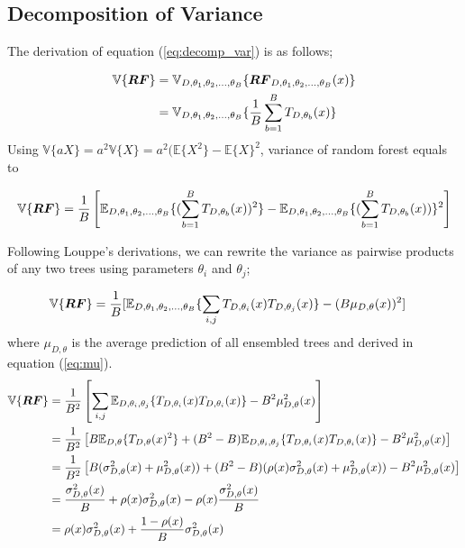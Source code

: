 \subsection{Decomposition of Variance}
\label{app:var_decomp}
The derivation of equation (\ref{eq:decomp_var}) is as follows;

\begin{align}
\mathbb{V}\{\boldsymbol{RF}\} & = \mathbb{V}_{D, \theta_{1}, \theta_{2},..., \theta_{B}}\{\boldsymbol{RF}_{D, \theta_{1},\theta_{2},..., \theta_{B}}(x) \}\notag \\
& = \mathbb{V}_{D, \theta_{1}, \theta_{2},..., \theta_{B}}\{\dfrac{1}{B}\sum_{b=1}^{B} T_{D,\theta_{b}}(x)\} \notag
\end{align}
Using $\mathbb{V}\{aX\} = a^2\mathbb{V}\{X\} = a^2 (\mathbb{E}\{X^2\} - \mathbb{E}\{X\}^2$, variance of random forest equals to

\begin{align}
\mathbb{V}\{\boldsymbol{RF}\} = \dfrac{1}{B}\left[\mathbb{E}_{D, \theta_{1}, \theta_{2},..., \theta_{B}}\{( \sum_{b=1}^{B} T_{D, \theta_{b}}(x))^2 \} - \mathbb{E}_{D, \theta_{1}, \theta_{2},..., \theta_{B}}\{( \sum_{b=1}^{B} T_{D, \theta_{b}}(x)) \}^2\right] \notag
\end{align}

Following Louppe's derivations, we can rewrite the variance as pairwise products of any two trees using parameters $\theta_{i}$ and $\theta_{j}$;

\begin{align}
\mathbb{V}\{\boldsymbol{RF}\} & = \dfrac{1}{B}[\mathbb{E}_{D, \theta_{1}, \theta_{2},..., \theta_{B}}\{\sum_{i,j} T_{D,\theta_{i}}(x) T_{D,\theta_{j}}(x)\} - (B \mu_{D,\theta}(x))^2] \notag
\end{align}
where $\mu_{D, \theta}$ is the average prediction of all ensembled trees and derived in equation (\ref{eq:mu}).
\begin{align}
\mathbb{V}\{\boldsymbol{RF}\} & = \dfrac{1}{B^2}\left[\sum_{i,j} \mathbb{E}_{D, \theta_{i}, \theta_{j}}\{T_{D,\theta_{i}}(x) T_{D,\theta_{i}}(x)\} - B^2 \mu_{D,\theta}^2(x)\right]\notag \\
& = \dfrac{1}{B^2}\left[B\mathbb{E}_{D,\theta}\{T_{D,\theta}(x)^2\} + (B^2 - B) \mathbb{E}_{D, \theta_{i}, \theta_{j}}\{T_{D,\theta_{i}}(x) T_{D,\theta_{i}}(x)\} - B^2 \mu_{D,\theta}^2(x)\right]\notag \\
& = \dfrac{1}{B^2}\left[B(\sigma_{D,\theta}^2(x) + \mu_{D,\theta}^2(x)) + (B^2 - B) (\rho(x)\sigma_{D,\theta}^2(x) + \mu_{D, \theta}^2(x)) - B^2 \mu_{D,\theta}^2(x)\right] \notag \\
& = \dfrac{\sigma_{D,\theta}^2(x)}{B} + \rho(x)\sigma_{D,\theta}^2(x) - \rho(x)\dfrac{\sigma_{D,\theta}^2(x)}{B}\notag \\
& = \rho(x)\sigma_{D,\theta}^2(x) + \dfrac{1 - \rho(x)}{B}\sigma_{D,\theta}^2(x) \notag
\end{align}
